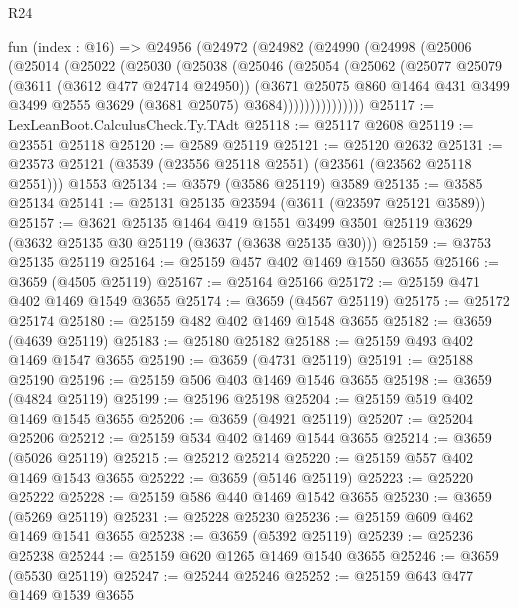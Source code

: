 \begin{lexlean}{R24}
\begin{coremodule}
    fun (index : @16) =>
    @24956
      (@24972
        (@24982
          (@24990
            (@24998
              (@25006
                (@25014
                  (@25022
                    (@25030
                      (@25038
                        (@25046
                          (@25054
                            (@25062
                              (@25077
                                @25079
                                (@3611 (@3612 @477 @24714 @24950))
                                (@3671
                                  @25075
                                  @860
                                  @1464
                                  @431
                                  @3499
                                  @3499
                                  @2555
                                  @3629
                                  (@3681 @25075)
                                  @3684)))))))))))))))
@25117 := LexLeanBoot.CalculusCheck.Ty.TAdt
@25118 := @25117 @2608
@25119 := @23551 @25118
@25120 := @2589 @25119
@25121 := @25120 @2632
@25131 := @23573 @25121 (@3539 (@23556 @25118 @2551) (@23561 (@23562 @25118 @2551))) @1553
@25134 := @3579 (@3586 @25119) @3589
@25135 := @3585 @25134
@25141 := @25131 @25135 @23594 (@3611 (@23597 @25121 @3589))
@25157 := @3621
    @25135
    @1464
    @419
    @1551
    @3499
    @3501
    @25119
    @3629
    (@3632 @25135 @30 @25119 (@3637 (@3638 @25135 @30)))
@25159 := @3753 @25135 @25119
@25164 := @25159 @457 @402 @1469 @1550 @3655
@25166 := @3659 (@4505 @25119)
@25167 := @25164 @25166
@25172 := @25159 @471 @402 @1469 @1549 @3655
@25174 := @3659 (@4567 @25119)
@25175 := @25172 @25174
@25180 := @25159 @482 @402 @1469 @1548 @3655
@25182 := @3659 (@4639 @25119)
@25183 := @25180 @25182
@25188 := @25159 @493 @402 @1469 @1547 @3655
@25190 := @3659 (@4731 @25119)
@25191 := @25188 @25190
@25196 := @25159 @506 @403 @1469 @1546 @3655
@25198 := @3659 (@4824 @25119)
@25199 := @25196 @25198
@25204 := @25159 @519 @402 @1469 @1545 @3655
@25206 := @3659 (@4921 @25119)
@25207 := @25204 @25206
@25212 := @25159 @534 @402 @1469 @1544 @3655
@25214 := @3659 (@5026 @25119)
@25215 := @25212 @25214
@25220 := @25159 @557 @402 @1469 @1543 @3655
@25222 := @3659 (@5146 @25119)
@25223 := @25220 @25222
@25228 := @25159 @586 @440 @1469 @1542 @3655
@25230 := @3659 (@5269 @25119)
@25231 := @25228 @25230
@25236 := @25159 @609 @462 @1469 @1541 @3655
@25238 := @3659 (@5392 @25119)
@25239 := @25236 @25238
@25244 := @25159 @620 @1265 @1469 @1540 @3655
@25246 := @3659 (@5530 @25119)
@25247 := @25244 @25246
@25252 := @25159 @643 @477 @1469 @1539 @3655

\end{coremodule}
\end{lexlean}
